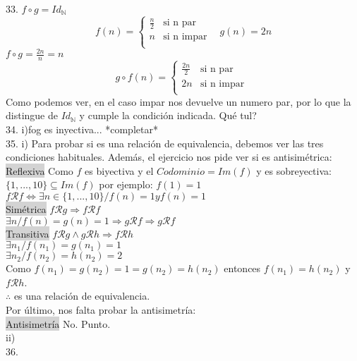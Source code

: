 \documentclass[a4paper,11pt]{article}
\begin{document}
33. $f \circ g = Id_\mathbb{N}$
\[
  f(n) =
  \begin{cases}
                                   \frac{n}{2} & \text{si n par} \\
                                   n & \text{si n impar}\\
                                   
  \end{cases}
  \:\:\:\:g(n) = 2n
%
\]
$f \circ g = \frac{2n}{n} = n$
\[
  g \circ f(n) =
  \begin{cases}
                                   \frac{2n}{2} & \text{si n par$$} \\
                                   2n & \text{si n impar $$}\\
                                   
  \end{cases}
%
\]
Como podemos ver, en el caso impar nos devuelve un numero par, por lo que la distingue de $Id_\mathbb{N}$ y cumple la condición indicada. Qué tul?\\
34. i)fog es inyectiva... *completar*\\
35. i) Para probar si es una relación de equivalencia, debemos ver las tres condiciones habituales. Además, el ejercicio nos pide ver si es antisimétrica:\\
\colorbox{lightgray}{Reflexiva} Como $f$ es biyectiva y el $Codominio=Im(f)$ y es sobreyectiva:\\
$\{1,...,10\}\subseteq Im(f)$ por ejemplo: $f(1)=1$\\
$f\mathcal{R}f \Leftrightarrow \exists n \in \{1,...,10\} / f(n) = 1 y f(n) = 1 $\\
\colorbox{lightgray}{Simétrica} $f \mathcal{R} g \Rightarrow f \mathcal{R} f $\\
$ \exists n / f(n) = g(n) = 1 \Rightarrow g \mathcal{R} f \Rightarrow g \mathcal{R} f $ \\
\colorbox{lightgray}{Transitiva} $f \mathcal{R}g \land g\mathcal{R}h \Rightarrow f \mathcal{R}h$\\
$ \exists n_1 / f(n_1)=g(n_1)=1$\\
$ \exists n_2 / f(n_2)=h(n_2)=2$\\
Como $f(n_1)=g(n_2)=1=g(n_2)=h(n_2)$ entonces $f(n_1)=h(n_2)$ y $f\mathcal{R}h$. \\
$\therefore$ es una relación de equivalencia. \\
Por último, nos falta probar la antisimetría:\\
\colorbox{lightgray}{Antisimetría} No. Punto. \\
ii)\\
36.\\
\end{document}
